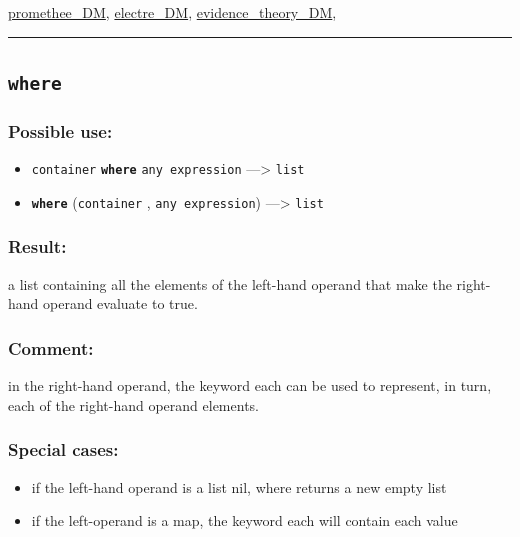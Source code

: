 \documentclass[]{book}
\providecommand{\tightlist}{%
  \setlength{\itemsep}{0pt}\setlength{\parskip}{0pt}}
\theoremstyle{definition}
\theoremstyle{definition}
\theoremstyle{definition}
\theoremstyle{remark}
\begin{document}
\href{operators-n-to-r.html\#promethee_dm}{promethee\_DM},
\href{operators-d-to-h.html\#electre_dm}{electre\_DM},
\href{operators-d-to-h.html\#evidence_theory_dm}{evidence\_theory\_DM},

\begin{center}\rule{0.5\linewidth}{\linethickness}\end{center}

\subsection{\texorpdfstring{\texttt{where}}{where}}\label{where}

\subsubsection{Possible use:}\label{possible-use-555}

\begin{itemize}
\tightlist
\item
  \texttt{container} \textbf{\texttt{where}} \texttt{any\ expression}
  ---\textgreater{} \texttt{list}
\item
  \textbf{\texttt{where}} (\texttt{container} ,
  \texttt{any\ expression}) ---\textgreater{} \texttt{list}
\end{itemize}

\subsubsection{Result:}\label{result-534}

a list containing all the elements of the left-hand operand that make
the right-hand operand evaluate to true.

\subsubsection{Comment:}\label{comment-108}

in the right-hand operand, the keyword each can be used to represent, in
turn, each of the right-hand operand elements.

\subsubsection{Special cases:}\label{special-cases-146}

\begin{itemize}
\tightlist
\item
  if the left-hand operand is a list nil, where returns a new empty
  list\\
\item
  if the left-operand is a map, the keyword each will contain each value
\end{itemize}
\end{document}
